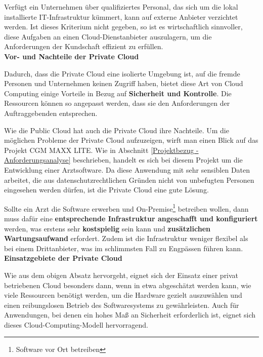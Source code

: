         Verfügt ein Unternehmen über qualifiziertes Personal, das sich um die lokal installierte IT-Infrastruktur kümmert, kann auf externe Anbieter
        verzichtet werden. Ist dieses Kriterium nicht gegeben, so ist es wirtschaftlich sinnvoller, diese Aufgaben an einen Cloud-Dienstanbieter auszulagern, um die Anforderungen der Kundschaft effizient zu erfüllen.
        \cite{EA:Web54} \\
    
    
        \textbf{Vor- und Nachteile der Private Cloud}
    
        Dadurch, dass die Private Cloud eine isolierte Umgebung ist, auf die fremde Personen und Unternehmen keinen Zugriff haben, bietet diese Art von Cloud Computing einige Vorteile in Bezug auf \textbf{Sicherheit und Kontrolle}.
        Die Ressourcen können so angepasst werden, dass sie den Anforderungen der Auftraggebenden entsprechen.
    
        Wie die Public Cloud hat auch die Private Cloud ihre Nachteile. Um die möglichen Probleme der Private Cloud aufzuzeigen, wirft man einen Blick auf das Projekt CGM MAXX LITE. Wie in Abschnitt \ref{Projektbezug - Anforderungsanalyse} beschrieben, handelt es sich bei diesem Projekt um die Entwicklung einer Arztsoftware. Da diese Anwendung mit sehr sensiblen Daten arbeitet, die aus datenschutzrechtlichen Gründen nicht von unbefugten Personen eingesehen werden dürfen, ist die Private Cloud eine gute Lösung. 
    
        Sollte ein Arzt die Software erwerben und On-Premise\footnote{Software vor Ort betreiben} betreiben wollen, dann muss dafür eine \textbf{entsprechende Infrastruktur angeschafft und konfiguriert} werden, was erstens sehr \textbf{kostspielig} sein kann und \textbf{zusätzlichen Wartungsaufwand} erfordert. Zudem ist die Infrastruktur weniger flexibel als bei einem Drittanbieter, was im schlimmsten Fall zu Engpässen führen kann.
        \cite{EA:Web56} \\
    
    
        \textbf{Einsatzgebiete der Private Cloud}
    
        Wie aus dem obigen Absatz hervorgeht, eignet sich der Einsatz einer privat betriebenen Cloud besonders dann, wenn in etwa abgeschätzt werden kann, wie viele Ressourcen benötigt werden, um die Hardware gezielt auszuwählen und einen reibungslosen Betrieb des Softwaresystems zu gewährleisten. Auch für Anwendungen, bei denen ein hohes Maß an Sicherheit erforderlich ist, eignet sich dieses Cloud-Computing-Modell hervorragend.
    
